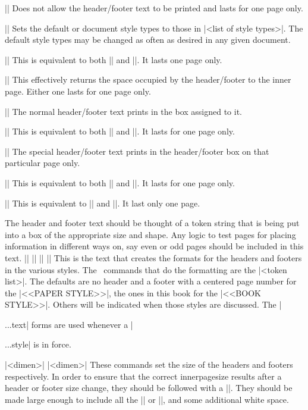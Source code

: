 \beginblockmode
\mbr
\ext\@|\blankheaderstyle  \blankfooterstyle|
\nbr
Does not allow the header/footer text to be printed and  lasts for one
page only.

\mbr
\ext\@||
\nbr
Sets the default or document style types to those in 
|<list of style types>|.  The default style types may be changed as often as
desired in any given document. 

\mbr
\ext\@|\fullpagestyle|
\nbr
This is equivalent to both |\noheaderstyle| and |\nofooterstyle|. It lasts
one page only.

\mbr
\ext\@|\noheaderstyle  \nofooterstyle|
\nbr
This effectively returns the space occupied by the header/footer to the inner
page. Either one lasts for one page only. 

\mbr
\ext\@|\normalheaderstyle \normalfooterstyle|
\nbr
The normal header/footer text prints in the box assigned to it.

\mbr
\ext\@|\normalpagestyle|
\nbr
This is equivalent to both |\normalheaderstyle| and |\normalfooterstyle|. It
lasts for one page only.

\mbr
\ext\@|\specialheaderstyle \specialfooterstyle|
\nbr
The special header/footer text prints in the header/footer box on 
that particular page only.

\mbr
\ext\@|\specialpagestyle|
\nbr
This is equivalent to both |\specialheaderstyle| and |\specialfooterstyle|. It
lasts for one page only.



\mbr
\ext\@|\titlepagestyle|
\nbr
This is equivalent to |\blankheaderstyle| and |\blankfooterstyle|. It last
only one page.
\endblockmode

The header and footer text should be thought of a token string that is being
put into a box of the appropriate size and shape. Any logic to test pages for
placing information in different ways on, say even or odd pages should be
included in this text. 
\beginblockmode
\mbr
\ext\@||
\nbr
\ext\@||
\nbr
\ext\@||
\nbr
\ext\@||
\nbr
This is the text that creates the formats for the headers and footers in the
various styles. The \tex\ commands that do the formatting are  
the |<token list>|. The defaults are no header and a footer with a centered
page number for the |<<PAPER STYLE>>|, the ones in this book for the 
|<<BOOK STYLE>>|. Others will be indicated when those styles are discussed.
The |\special...text| forms are used whenever a |\special...style| is in
force. 

\mbr
\ext\@|\vheadersize [=] <dimen>|
\nbr
\ext\@|\vfooterersize [=] <dimen>|
\nbr
These commands set the size of the headers and footers respectively. 
In order to ensure that the correct innerpagesize results after a header or
footer size change, they should be followed with a |\setpagesizes|.
They
should be made large enough to include all the |\headertext| or
|\footertext|, and some additional white space.
\endblockmode

\ejectpage
\done
